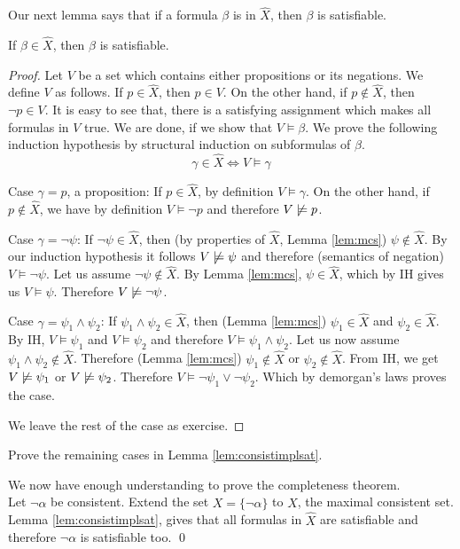 Our next lemma says that if a formula $\beta$ is in $\hat X$, then $\beta$ is satisfiable. 
\begin{lemma}
If $\beta \in \hat X$, then $\beta$ is satisfiable.
\label{lem:consistimplsat}
\end{lemma}
\begin{proof}
Let $V$ be a set which contains either propositions or its negations. We define $V$ as follows. If $p \in \hat X$, then $p \in V$. On the other hand, if $p \notin \hat X$, then $\neg p \in V$. It is easy to see that, there is a satisfying assignment which makes all formulas in $V$ true. We are done, if we show that $V \models \beta$. We prove the following induction hypothesis by structural induction on subformulas of $\beta$.
\[
\gamma \in \hat X \iff V \models \gamma
\]

Case $\gamma=p$, a proposition: If $p \in \hat X$, by definition $V \models \gamma$. On the other hand, if $p \notin \hat X$, we have by definition $V \models \neg p$ and therefore $V \not \models p$.

Case $\gamma = \neg \psi$: If $\neg \psi \in \hat X$, then (by properties of $\hat X$, Lemma \ref{lem:mcs}) $\psi \notin \hat X$. By our induction hypothesis it follows $V \not \models \psi$ and therefore (semantics of negation) $V \models \neg \psi$. Let us assume $\neg \psi \notin \hat X$. By Lemma \ref{lem:mcs}, $\psi \in \hat X$, which by IH gives us $V \models \psi$. Therefore $V \not \models \neg \psi$.

Case $\gamma = \psi_1 \wedge \psi_2$: If $\psi_1 \wedge \psi_2 \in \hat X$, then (Lemma \ref{lem:mcs}) $\psi_1 \in \hat X$ and $\psi_2 \in \hat X$. By IH, $V \models \psi_1$ and $V \models \psi_2$ and therefore $V \models \psi_1 \wedge \psi_2$. Let us now assume $\psi_1 \wedge \psi_2 \notin \hat X$. Therefore (Lemma \ref{lem:mcs}) $\psi_1 \notin \hat X$ or $\psi_2 \notin \hat X$. From IH, we get $V \not \models \psi_1$ or $V \not \models \psi_2$. Therefore $V \models \neg \psi_1 \vee \neg \psi_2$. Which by demorgan's laws proves the case.

We leave the rest of the case as exercise.
\end{proof}
\begin{exercise}
Prove the remaining cases in Lemma \ref{lem:consistimplsat}.
\end{exercise}

We now have enough understanding to prove the completeness theorem. \\

 Let $\neg \alpha$ be consistent. Extend the set $X = \{\neg \alpha\}$ to $\hat X$, the maximal consistent set. Lemma \ref{lem:consistimplsat}, gives that all formulas in $\hat X$ are satisfiable and therefore $\neg \alpha$ is satisfiable too. \qed

